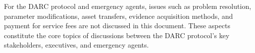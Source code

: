 \documentclass[main.tex]{subfiles}
\begin{document}
For the DARC protocol and emergency agents, issues such as problem resolution, parameter modifications, asset transfers, evidence acquisition methods, and payment for service fees are not discussed in this document. These aspects constitute the core topics of discussions between the DARC protocol's key stakeholders, executives, and emergency agents.
\end{document}
